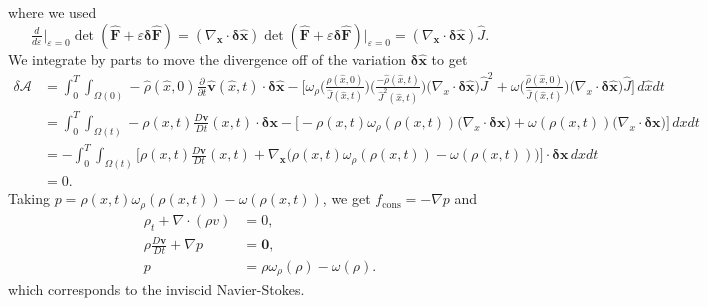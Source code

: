 \documentclass[final,10pt]{article}
\begin{document}
where we used
\[
	\frac{_d}{^{d\varepsilon}}\big|_{\varepsilon=0} \det( \hat{\bm F} + \varepsilon\bm\delta\hat{\bm F} ) 
			= (\nabla_{\bm x} \cdot \bm \delta \hat{\bm x}) \det( \hat{\bm F} + \varepsilon\bm\delta\hat{\bm F} ) \big|_{\varepsilon=0}
			= (\nabla_{\bm x} \cdot \bm \delta \hat{\bm x}) \hat{J}.
\]
We integrate by parts to move the divergence off of the variation $\bm\delta\hat{\bm x}$ to get
\begin{align}
	\delta \mathcal A &= \int_0^T \int_{\Omega(0)} -\hat{\rho}(\hat{x},0) \frac{\partial}{\partial t}\hat{\bm v}(\hat{x},t)\cdot\bm\delta\hat{\bm x}
							- \bigg[ \omega_\rho\bigg( \frac{\hat{\rho}(\hat{x},0)}{\hat{J}(\hat{x},t)} \bigg) \bigg(\frac{-\hat{\rho}(\hat{x},t)}{\hat{J}^2(\hat{x},t)}\bigg)
								\big(\nabla_{x} \cdot \bm\delta\hat{\bm x}\big)\hat{J}^2
								+ \omega\bigg( \frac{\hat{\rho}(\hat{x},0)}{\hat{J}(\hat{x},t)}\bigg)\big(\nabla_{x} \cdot \bm\delta\hat{\bm x}\big)\hat{J} \bigg] \, d\hat{x}dt
								\nonumber\\
					&= \int_0^T \int_{\Omega(t)} -{\rho}({x},t) \frac{D\bm v}{D t}({x},t)\cdot\bm\delta{\bm x}
							- \bigg[ -\rho(x,t) \omega_\rho({\rho}({x},t))\big(\nabla_{x} \cdot \bm\delta{\bm x}\big)
								+ \omega( \rho({x},t) )\big(\nabla_{x} \cdot \bm\delta{\bm x}\big) \bigg] \, d{x}dt\nonumber\\
					&= -\int_0^T \int_{\Omega(t)} \bigg[ {\rho}({x},t) \frac{D\bm v}{D t}({x},t)
							+ \nabla_{\bm x} \Big( \rho(x,t)\omega_\rho({\rho}({x},t))
								- \omega( \rho({x},t) ) \Big) \bigg]\cdot \bm\delta{\bm x} \, d{x}dt \label{inviscid action}\\
					&= 0.
\end{align}
Taking $p = \rho(x,t)\omega_\rho({\rho}({x},t)) - \omega(\rho({x},t))$, we get $f_\mathrm{cons} = -\nabla p$ and
\begin{align}
	\rho_t + \nabla \cdot(\rho v)		&= 0,	\tag{Conservation of Mass}\\
						{\rho} \frac{D\bm v}{D t} + \nabla p	&= \bm 0,	\tag{Least Action Principle}\\
												p	&=\rho\omega_\rho({\rho}) - \omega(\rho).
															\tag{Equation of State}
\end{align}
which corresponds to the inviscid Navier-Stokes.
\end{document}
